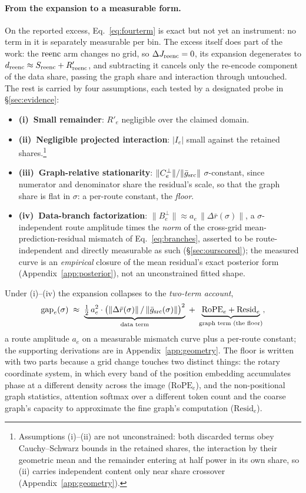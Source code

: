 \paragraph{From the expansion to a measurable form.}
On the reported excess, Eq.~\ref{eq:fourterm} is exact but not yet an
instrument: no term in it is separately measurable per bin. The
excess itself does part of the work: the $\mathrm{reenc}$ arm changes no
grid, so $\Delta J_{\mathrm{reenc}} = 0$, its expansion degenerates to
$d_{\mathrm{reenc}} \approx S_{\mathrm{reenc}} + R'_{\mathrm{reenc}}$, and subtracting it
cancels only the re-encode component of the data share, passing the
graph share and interaction through untouched. The rest is carried by
four assumptions, each tested by a designated probe in
\S\ref{sec:evidence}:
\begin{itemize}
\item \textbf{(i)~Small remainder}: $R'_e$ negligible over the
claimed domain.
\item \textbf{(ii)~Negligible projected interaction}: $|I_e|$ small
against the retained shares.\footnote{Assumptions (i)--(ii) are not
unconstrained: both discarded terms obey Cauchy--Schwarz bounds
in the retained shares, the interaction by their geometric mean and
the remainder entering at half power in its own share, so (ii)
carries independent content only near share crossover
(Appendix~\ref{app:geometry}).}
\item \textbf{(iii)~Graph-relative stationarity}:
$\|C_e^{\perp}\| / \|\bar g_{\mathrm{src}}\|$ $\sigma$-constant, since
numerator and denominator share the residual's scale, so that the
graph share is flat in $\sigma$: a per-route constant, the
\emph{floor}.
\item \textbf{(iv)~Data-branch factorization}:
$\|B_e^{\perp}\| \approx a_e\,\|\Delta \bar r(\sigma)\|$, a
$\sigma$-independent route amplitude times the \emph{norm} of the
cross-grid mean-prediction-residual mismatch of Eq.~\ref{eq:branches},
asserted to be route-independent and directly measurable as such
(\S\ref{sec:ourscored}); the measured curve is an \emph{empirical}
closure of the mean residual's exact posterior form
(Appendix~\ref{app:posterior}), not an unconstrained fitted shape.
\end{itemize}
Under (i)--(iv) the expansion collapses to the \emph{two-term
account},
\begin{equation}
\mathrm{gap}_e(\sigma)
\;\approx\;
\underbrace{\tfrac{1}{2}\,a_e^2 \cdot \big(\|\Delta \bar r(\sigma)\| \,/\, \|\bar g_{\mathrm{src}}(\sigma)\|\big)^{2}}_{\text{data term}}
\;+\; \underbrace{\mathrm{RoPE}_e + \mathrm{Resid}_e}_{\text{graph term (the floor)}},
\label{eq:twoterm}
\end{equation}
a route amplitude $a_e$ on a measurable mismatch curve plus a
per-route constant; the supporting derivations are in
Appendix~\ref{app:geometry}. The floor is written with two parts
because a grid change touches two distinct things: the rotary
coordinate system, in which every band of the position embedding
accumulates phase at a different density across the image
($\mathrm{RoPE}_e$), and the non-positional graph statistics,
attention softmax over a different token count and the coarse graph's
capacity to approximate the fine graph's computation
($\mathrm{Resid}_e$).

